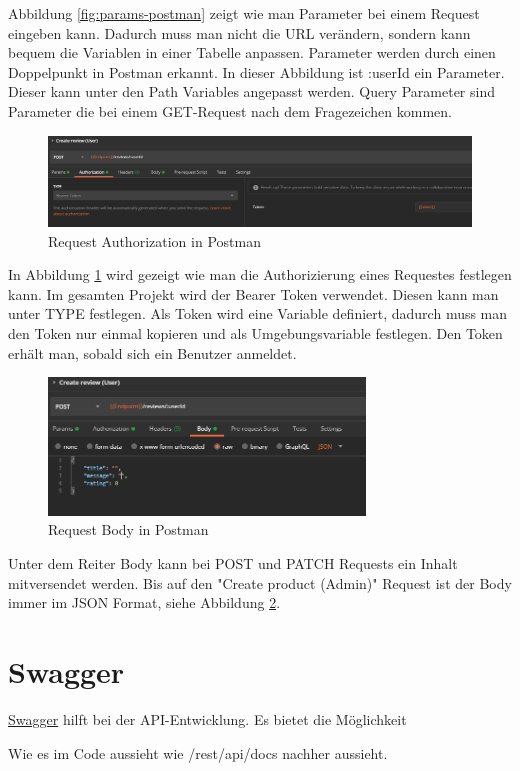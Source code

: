 Abbildung \ref{fig:params-postman} zeigt wie man Parameter bei einem Request eingeben kann. Dadurch muss man nicht die URL verändern, sondern kann bequem die Variablen in einer Tabelle anpassen. Parameter werden durch einen Doppelpunkt in Postman erkannt. In dieser Abbildung ist :userId ein Parameter. Dieser kann unter den Path Variables angepasst werden. Query Parameter sind Parameter die bei einem GET-Request nach dem Fragezeichen kommen.

\begin{figure}[H]
 \centering
 \includegraphics[width=\textwidth,height=0.6\textheight,keepaspectratio]{images/Postman_token.png}
 \caption{Request Authorization in Postman}
 \label{fig:authorization-postman}
\end{figure}

In Abbildung \ref{fig:authorization-postman} wird gezeigt wie man die Authorizierung eines Requestes festlegen kann. Im gesamten Projekt wird der Bearer Token verwendet. Diesen kann man unter TYPE festlegen. Als Token wird eine Variable definiert, dadurch muss man den Token nur einmal kopieren und als Umgebungsvariable festlegen. Den Token erhält man, sobald sich ein Benutzer anmeldet.

\begin{figure}[H]
 \centering
 \includegraphics[width=0.75\textwidth,height=0.6\textheight,keepaspectratio]{images/Postman_body.png}
 \caption{Request Body in Postman}
 \label{fig:body-postman}
\end{figure}

Unter dem Reiter Body kann bei POST und PATCH Requests ein Inhalt mitversendet werden. Bis auf den "Create product (Admin)" Request ist der Body immer im JSON Format, siehe Abbildung \ref{fig:body-postman}.

\section{Swagger}
\hyperlink{https://swagger.io/}{Swagger} hilft bei der API-Entwicklung. Es bietet die Möglichkeit 

Wie es im Code aussieht
wie /rest/api/docs nachher aussieht.


